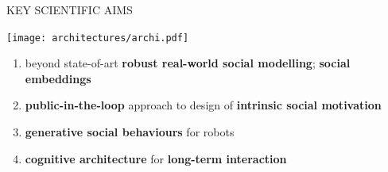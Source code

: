 \documentclass[xcolor=table]{beamer}
\begin{document}
%
%
%
%
%
%
%

\begin{frame}{KEY SCIENTIFIC AIMS}
    \begin{center}
        \texttt{[image: architectures/archi.pdf]}
    \end{center}

    \begin{enumerate}
            \scriptsize
        \item beyond state-of-art \textbf{robust real-world social modelling}; \textbf{social embeddings}
        \item \textbf{public-in-the-loop} approach to design of \textbf{intrinsic social motivation}
        \item \textbf{generative social behaviours} for robots
        \item \textbf{cognitive architecture} for \textbf{long-term interaction}
    \end{enumerate}
\end{frame}
\end{document}
